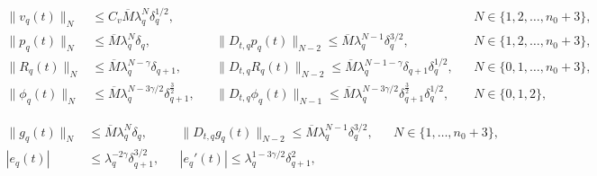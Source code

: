 \documentclass[10pt,a4paper]{amsart}
\newcommand{\oM}{\overline{M}}
\newcommand{\qq}{_{q+1}}
\begin{document}
   \begin{align}
        \label{s:V} \|v_q(t)\|_{N}
        &\le C_v \oM\lambda_q^N\delta_q^{1/2}, 
        &&
        && 
        N \in \{1,2,\dots,n_0+3\},
        \\
        \label{s:P} \|p_q(t)\|_{N}&\le \overline{M} \lambda_q^N\delta_q,
        &&
        \|D_{t,q}p_q(t)\|_{N-2}\le \overline{M}\lambda_q^{N-1}\delta_q^{3/2}, 
        &&  
        N \in \{1,2,\dots,n_0+3\},
        \\
        \label{s:R} \|R_q(t)\|_{N}&\le \oM\lambda_q^{N-\gamma}\delta_{q+1},
        &&
        \|D_{t,q}R_q(t)\|_{N-2}\le \oM \lambda_q^{N-1-\gamma}\delta\qq\delta_q^{1/2}, 
        &&  
        N \in \{0,1,\dots,n_0+3\},
        \\
        \label{s:Phi} \|\phi_q(t)\|_{N}
        &\le \oM\lambda_q^{N-3\gamma/2}\delta_{q+1}^{\frac{3}{2}},
        &&
        \|D_{t,q}\phi_q(t)\|_{N-1}\le \oM \lambda_q^{N-3\gamma/2}\delta_{q+1}^{\frac{3}{2}}\delta_q^{1/2}, 
        &&   
        N \in \{0,1,2\},
   \end{align}

   \begin{align}
        \label{s:g3}
        \|g_q(t)\|_N&\le \overline{M}\lambda_q^N\delta_q,
        &&
        \|D_{t,q}g_q(t)\|_{N-2}\le\overline{M}\lambda_q^{N-1}\delta_q^{3/2},
        &&
        N \in \{1,\dots,n_0+3\},
        \\
        \label{s:e3}
        |e_q (t)| 
        &\leq \lambda_{q}^{-2\gamma} \delta\qq^{3/2},
        &&
        |e_q' (t)| 
        \leq \lambda_{q}^{1-3\gamma/2} \delta\qq^{2},
   \end{align}
\end{document}
